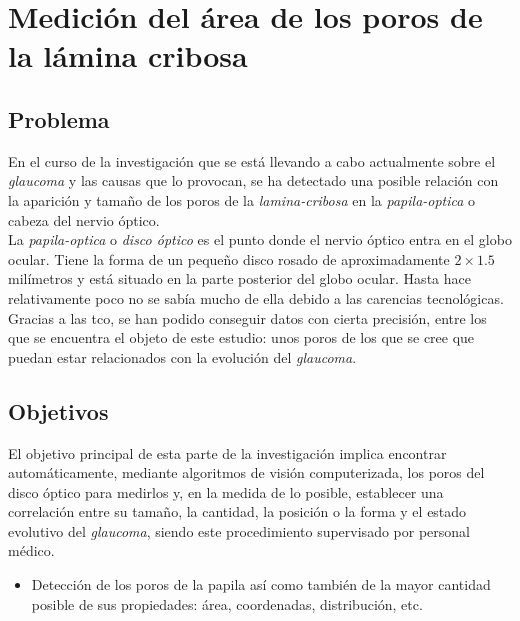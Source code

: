 \chapter{Medición del área de los poros de la lámina cribosa}
\section{Problema}
En el curso de la investigación que se está llevando a cabo
actualmente sobre el \emph{\gls{glaucoma}} y las causas que lo
provocan, se ha detectado una posible relación con la aparición y
tamaño de los poros de la \emph{\gls{lamina-cribosa}} en la
\emph{\gls{papila-optica}} o cabeza del nervio óptico. \\
La \emph{\gls{papila-optica}} o \emph{disco óptico} es el punto donde
el nervio óptico entra en el globo ocular. Tiene la forma de un
pequeño disco rosado de aproximadamente $2 \times 1.5$ milímetros y
está situado en la parte posterior del globo ocular. Hasta hace
relativamente poco no se sabía mucho de ella debido a las carencias
tecnológicas. Gracias a las \gls{tco}, se han podido conseguir datos
con cierta precisión, entre los que se encuentra el objeto de este
estudio: unos poros de los que se cree que puedan estar
relacionados con la evolución del \emph{\gls{glaucoma}}.

\section{Objetivos}
El objetivo principal de esta parte de la investigación implica
encontrar automáticamente, mediante algoritmos de visión
computerizada, los poros del disco óptico para medirlos y, en la
medida de lo posible, establecer una correlación entre su tamaño, la
cantidad, la posición o la forma y el estado evolutivo del
\emph{\gls{glaucoma}}, siendo este procedimiento supervisado por
personal médico.
\begin{itemize}
\item Detección de los poros de la papila así como también de la mayor
  cantidad posible de sus propiedades: área, coordenadas,
  distribución, etc.
\end{itemize}

